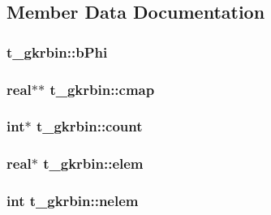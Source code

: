 \subsection{\-Member \-Data \-Documentation}
\hypertarget{structt__gkrbin_aa4e4b86e1ee41e79f33630cc89a25884}{
\subsubsection[{b\-Phi}]{ {\bf t\-\_\-gkrbin\-::b\-Phi}}}\label{structt__gkrbin_aa4e4b86e1ee41e79f33630cc89a25884}
\hypertarget{structt__gkrbin_abf7c7137d345175593e9ea6ea3796de0}{
\subsubsection[{cmap}]{\setlength{\rightskip}{0pt plus 5cm}real$\ast$$\ast$ {\bf t\-\_\-gkrbin\-::cmap}}}\label{structt__gkrbin_abf7c7137d345175593e9ea6ea3796de0}
\hypertarget{structt__gkrbin_ae130dc73f651f71ef6fd19649e264c15}{
\subsubsection[{count}]{\setlength{\rightskip}{0pt plus 5cm}int$\ast$ {\bf t\-\_\-gkrbin\-::count}}}\label{structt__gkrbin_ae130dc73f651f71ef6fd19649e264c15}
\hypertarget{structt__gkrbin_a3d735c7a6c9afe43e3f1afc628f6982b}{
\subsubsection[{elem}]{\setlength{\rightskip}{0pt plus 5cm}real$\ast$ {\bf t\-\_\-gkrbin\-::elem}}}\label{structt__gkrbin_a3d735c7a6c9afe43e3f1afc628f6982b}
\hypertarget{structt__gkrbin_a79f2a28311188f9b51dde67cb8855958}{
\subsubsection[{nelem}]{\setlength{\rightskip}{0pt plus 5cm}int {\bf t\-\_\-gkrbin\-::nelem}}}\label{structt__gkrbin_a79f2a28311188f9b51dde67cb8855958}

